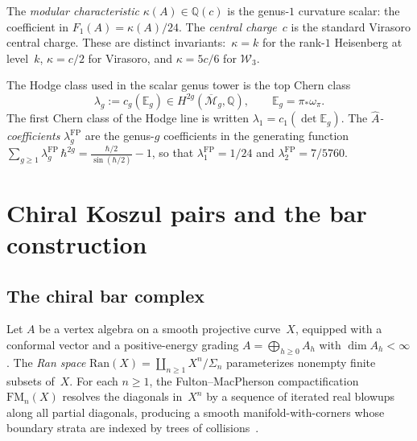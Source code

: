 \documentclass[11pt]{article}
\theoremstyle{plain}
\theoremstyle{definition}
\theoremstyle{remark}
\newcommand{\Ran}{\mathrm{Ran}}
\newcommand{\Mbar}{\overline{\mathcal{M}}}
\newcommand{\FM}{\mathrm{FM}}
\newcommand{\cW}{\mathcal{W}}
\begin{document}
The \emph{modular characteristic} $\kappa(A) \in \mathbb{Q}(c)$
is the genus-$1$ curvature scalar: the coefficient in
$F_1(A) = \kappa(A)/24$. The \emph{central charge}~$c$ is
the standard Virasoro central charge. These are distinct
invariants:\ $\kappa = k$ for the rank-$1$ Heisenberg at level~$k$,
$\kappa = c/2$ for Virasoro, and $\kappa = 5c/6$ for $\cW_3$.

The Hodge class used in the scalar genus tower is the top Chern class
\[
\lambda_g := c_g(\mathbb{E}_g) \in
H^{2g}(\Mbar_g, \mathbb{Q}),
\qquad
\mathbb{E}_g = \pi_*\omega_{\pi}.
\]
The first Chern class of the Hodge line is written
\(\lambda_1=c_1(\det\mathbb E_g)\). The
\emph{$\hat{A}$-coefficients} $\lambda_g^{\mathrm{FP}}$ are
the genus-$g$ coefficients in the generating function
$\sum_{g \geq 1} \lambda_g^{\mathrm{FP}}\,\hbar^{2g}
= \frac{\hbar/2}{\sin(\hbar/2)} - 1$,
so that $\lambda_1^{\mathrm{FP}} = 1/24$ and
$\lambda_2^{\mathrm{FP}} = 7/5760$.



\section{Chiral Koszul pairs and the bar construction}
\label{sec:bar}

\subsection{The chiral bar complex}

Let $A$ be a vertex algebra on a smooth projective curve~$X$,
equipped with a conformal vector and a positive-energy grading
$A = \bigoplus_{h \geq 0} A_h$ with $\dim A_h < \infty$.
The \emph{Ran space} $\Ran(X) = \coprod_{n \geq 1}
X^n / \Sigma_n$ parameterizes nonempty finite subsets of~$X$.
For each $n \geq 1$, the Fulton--MacPherson compactification
$\FM_n(X)$ resolves the diagonals in~$X^n$ by a sequence of
iterated real blowups along all partial diagonals, producing a
smooth manifold-with-corners whose boundary strata are indexed
by trees of collisions~\cite{GK}.
\end{document}
